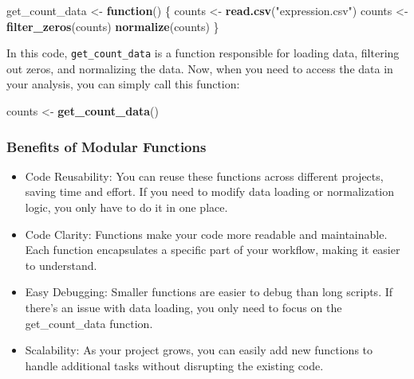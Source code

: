 \documentclass[
]{book}
\newenvironment{Shaded}{\begin{snugshade}}{\end{snugshade}}
\newcommand{\ControlFlowTok}[1]{\textcolor[rgb]{0.13,0.29,0.53}{\textbf{#1}}}
\newcommand{\FunctionTok}[1]{\textcolor[rgb]{0.13,0.29,0.53}{\textbf{#1}}}
\newcommand{\NormalTok}[1]{#1}
\newcommand{\OtherTok}[1]{\textcolor[rgb]{0.56,0.35,0.01}{#1}}
\newcommand{\StringTok}[1]{\textcolor[rgb]{0.31,0.60,0.02}{#1}}
\begin{document}
\begin{Shaded}
\begin{Highlighting}[]
\NormalTok{get\_count\_data }\OtherTok{\textless{}{-}} \ControlFlowTok{function}\NormalTok{() \{}
\NormalTok{  counts }\OtherTok{\textless{}{-}} \FunctionTok{read.csv}\NormalTok{(}\StringTok{"expression.csv"}\NormalTok{)}
\NormalTok{  counts }\OtherTok{\textless{}{-}} \FunctionTok{filter\_zeros}\NormalTok{(counts)}
  \FunctionTok{normalize}\NormalTok{(counts)}
\NormalTok{\}}
\end{Highlighting}
\end{Shaded}

In this code, \texttt{get\_count\_data} is a function responsible for loading data, filtering out zeros, and normalizing the data. Now, when you need to access the data in your analysis, you can simply call this function:

\begin{Shaded}
\begin{Highlighting}[]
\NormalTok{counts }\OtherTok{\textless{}{-}} \FunctionTok{get\_count\_data}\NormalTok{()}
\end{Highlighting}
\end{Shaded}

\hypertarget{benefits-of-modular-functions}{%
\subsubsection{Benefits of Modular Functions}\label{benefits-of-modular-functions}}

\begin{itemize}
\item
  Code Reusability: You can reuse these functions across different projects, saving time and effort. If you need to modify data loading or normalization logic, you only have to do it in one place.
\item
  Code Clarity: Functions make your code more readable and maintainable. Each function encapsulates a specific part of your workflow, making it easier to understand.
\item
  Easy Debugging: Smaller functions are easier to debug than long scripts. If there's an issue with data loading, you only need to focus on the get\_count\_data function.
\item
  Scalability: As your project grows, you can easily add new functions to handle additional tasks without disrupting the existing code.
\end{itemize}
\end{document}
